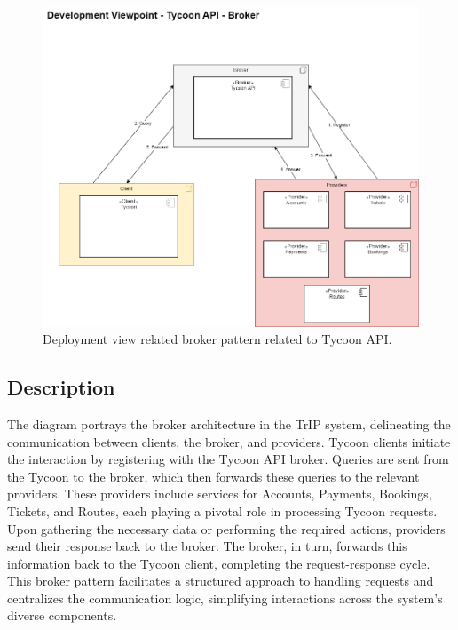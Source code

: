 \begin{figure}[H]
    \centering
    \includegraphics[width=\textwidth]{drawings/views_final_version/development_view_broker.png}
    \caption{Deployment view related broker pattern related to Tycoon API.}
    \label{fig:development_view_broker}
\end{figure}

\subsection*{Description}
The diagram portrays the broker architecture in the TrIP system, delineating the communication between clients, the broker, and providers. Tycoon clients initiate the interaction by registering with the Tycoon API broker. Queries are sent from the Tycoon to the broker, which then forwards these queries to the relevant providers. These providers include services for Accounts, Payments, Bookings, Tickets, and Routes, each playing a pivotal role in processing Tycoon requests. Upon gathering the necessary data or performing the required actions, providers send their response back to the broker. The broker, in turn, forwards this information back to the Tycoon client, completing the request-response cycle. This broker pattern facilitates a structured approach to handling requests and centralizes the communication logic, simplifying interactions across the system’s diverse components.


